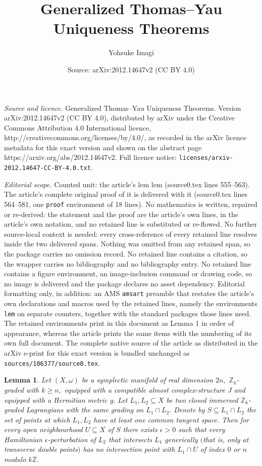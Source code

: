 \documentclass[10pt,a4paper]{amsart}
\title{Generalized Thomas--Yau Uniqueness Theorems}
\author{Yohsuke Imagi}
\date{Source: arXiv:2012.14647v2 (CC BY 4.0)}
\newtheorem{lem}{Lemma}
\def\Z{{\mathbin{\mathbb Z}}}
\def\ep{\epsilon}
\def\ge{\geqslant}
\def\l{\label}
\def\om{\omega}
\def\sb{\subseteq}
\begin{document}
\maketitle

\noindent\emph{Source and licence.} Generalized Thomas--Yau Uniqueness Theorems. Version arXiv:2012.14647v2 (CC BY 4.0), distributed by arXiv under the Creative Commons Attribution 4.0 International licence, http://creativecommons.org/licenses/by/4.0/, as recorded in the arXiv licence metadata for this exact version and shown on the abstract page https://arxiv.org/abs/2012.14647v2. Full licence notice: \texttt{licenses/arxiv-2012.14647-CC-BY-4.0.txt}.\par\smallskip

\noindent\textit{Editorial scope.} Counted unit: the article's lem lem (source0.tex lines 555--563). The article's complete original proof of it is delivered with it (source0.tex lines 564--581, one \texttt{proof} environment of 18 lines). No mathematics is written, repaired or re-derived: the statement and the proof are the article's own lines, in the article's own notation, and no retained line is substituted or re-flowed.  No further source-local context is needed: every cross-reference of every retained line resolves inside the two delivered spans.  Nothing was omitted from any retained span, so the package carries no omission record.  No retained line contains a citation, so the wrapper carries no bibliography and no bibliography entry.  No retained line contains a figure environment, an image-inclusion command or drawing code, so no image is delivered and the package declares no asset dependency.  Editorial formatting only, in addition: an AMS \texttt{amsart} preamble that restates the article's own declarations and macros used by the retained lines, namely the environments \texttt{lem} on separate counters, together with the standard packages those lines need.  The retained environments print in this document as Lemma 1 in order of appearance, whereas the article prints the same items with the numbering of its own full document.  The complete native source of the article as distributed in the arXiv e-print for this exact version is bundled unchanged as \texttt{sources/106377/source0.tex}.
\begin{lem}\l{P0}
Let $(X,\om)$ be a symplectic manifold of real dimension $2n,$ $\Z_k$-graded with $k\ge n,$
equipped with a compatible almost complex-structure $J$ and equipped with a Hermitian metric $g.$
Let $L_1,L_2\sb X$ be two closed immersed $\Z_k$-graded Lagrangians with the same grading on $L_1\cap L_2.$
Denote by $S\sb L_1\cap L_2$ the set of points at which $L_1,L_2$ have at least one common tangent space.
Then for every open neighbourhood $U\sb X$ of $S$
there exists $\ep>0$ such that every Hamiltonian $\ep$-perturbation of $L_2$ that intersects $L_1$ generically $($that is, only at transverse double points$)$
has no intersection point with $L_1\cap U$ of index $0$ or $n$ modulo $k\Z.$
\end{lem}
\end{document}
